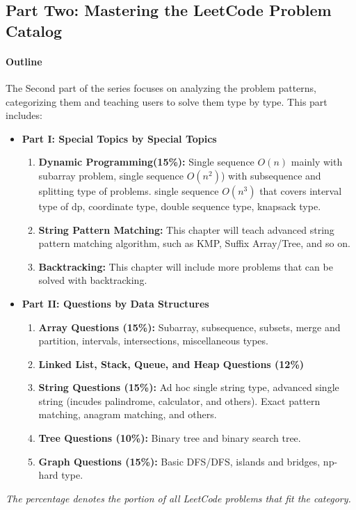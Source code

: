 \documentclass[12pt]{article}
\begin{document}
\subsection{Part Two: Mastering the LeetCode Problem Catalog}
\label{subsec_cracking}
\paragraph{Outline} The Second part of the series focuses on analyzing the problem patterns, categorizing them and teaching users to solve them type by type. This part includes:
\begin{itemize}
\item \textbf{Part \RN{1}: Special Topics by Special Topics}
\begin{enumerate}
    \item \textbf{Dynamic Programming(15\%):} Single sequence $O(n)$ mainly with subarray problem, single sequence $O(n^2)$) with subsequence and splitting type of problems. single sequence $O(n^3)$ that covers interval type of dp, coordinate type, double sequence type, knapsack type.
    \item \textbf{String Pattern Matching:} This chapter will teach advanced string pattern matching algorithm, such as KMP, Suffix Array/Tree, and so on.
    \item \textbf{Backtracking:} This chapter will include more problems that can be solved with backtracking. 
\end{enumerate}


\item \textbf{Part \RN{2}: Questions by Data Structures }
\begin{enumerate}
    \item \textbf{Array Questions (15\%):} Subarray, subsequence, subsets, merge and partition, intervals, intersections, miscellaneous types.
\item \textbf{ Linked List, Stack, Queue, and Heap Questions (12\%)}
\item \textbf{String Questions (15\%):} Ad hoc single string type, advanced single string (incudes palindrome, calculator, and others). Exact pattern matching, anagram matching, and others.
\item \textbf{Tree Questions (10\%):} Binary tree and binary search tree.
\item \textbf{Graph Questions (15\%):} Basic DFS/DFS, islands and bridges, np-hard type.
\end{enumerate}


\end{itemize}
\textit{The percentage denotes the portion of all LeetCode problems that fit the category.}
\end{document}
